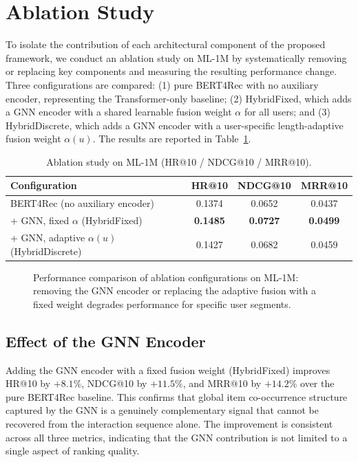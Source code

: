 \documentclass[12pt,a4paper]{report}
\begin{document}
\section{Ablation Study}
\label{sec:ablation}

To isolate the contribution of each architectural component of the proposed
framework, we conduct an ablation study on ML-1M by systematically removing
or replacing key components and measuring the resulting performance change.
Three configurations are compared: (1) pure BERT4Rec with no auxiliary
encoder, representing the Transformer-only baseline; (2) HybridFixed, which
adds a GNN encoder with a shared learnable fusion weight \(\alpha\) for all
users; and (3) HybridDiscrete, which adds a GNN encoder with a user-specific
length-adaptive fusion weight \(\alpha(u)\). The results are reported in
Table~\ref{tab:ablation}.

\begin{table}[h]
\centering
\caption{Ablation study on ML-1M (HR@10 / NDCG@10 / MRR@10).}
\label{tab:ablation}
\begin{tabular}{p{6.5cm} ccc}
\toprule
\textbf{Configuration} & \textbf{HR@10} & \textbf{NDCG@10} & \textbf{MRR@10} \\
\midrule
BERT4Rec (no auxiliary encoder)      & 0.1374 & 0.0652 & 0.0437 \\
+ GNN, fixed \(\alpha\) (HybridFixed)           & \textbf{0.1485} & \textbf{0.0727} & \textbf{0.0499} \\
+ GNN, adaptive \(\alpha(u)\) (HybridDiscrete)  & 0.1427 & 0.0682 & 0.0459 \\
\bottomrule
\end{tabular}
\end{table}

\begin{figure}[h]
    \centering
    \caption{Performance comparison of ablation configurations on ML-1M:
    removing the GNN encoder or replacing the adaptive fusion with a fixed
    weight degrades performance for specific user segments.}
    \label{fig:ablation_chart}
\end{figure}

\subsection*{Effect of the GNN Encoder}

Adding the GNN encoder with a fixed fusion weight (HybridFixed) improves
HR@10 by \(+8.1\%\), NDCG@10 by \(+11.5\%\), and MRR@10 by \(+14.2\%\)
over the pure BERT4Rec baseline. This confirms that global item co-occurrence
structure captured by the GNN is a genuinely complementary signal that cannot
be recovered from the interaction sequence alone. The improvement is consistent
across all three metrics, indicating that the GNN contribution is not limited
to a single aspect of ranking quality.
\end{document}
